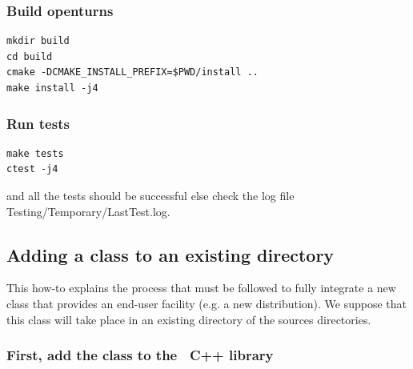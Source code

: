 \subsubsection{Build openturns}

\begin{lstlisting}
mkdir build
cd build
cmake -DCMAKE_INSTALL_PREFIX=$PWD/install ..
make install -j4
\end{lstlisting}

\subsubsection{Run tests}
\begin{lstlisting}
make tests
ctest -j4
\end{lstlisting}
and all the tests should be successful else check the log file Testing/Temporary/LastTest.log.

\subsection{Adding a class to an existing directory \label{SingleClass}}

This how-to explains the process that must be followed to fully integrate a new class that provides an end-user facility (e.g. a new distribution). We suppose that this class will take place in an existing directory of the sources directories.

\subsubsection{First, add the class to the \OT\ C++ library}


